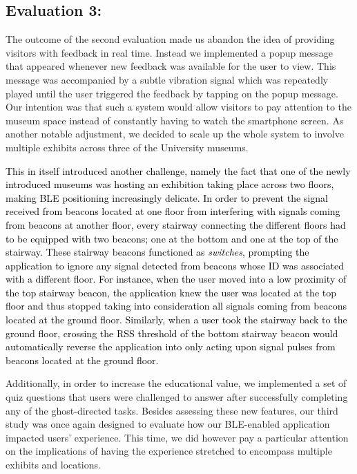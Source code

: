 \documentclass[prodmode,acmtomm]{acmsmall}
\begin{document}
\subsection{Evaluation 3: }
The outcome of the second evaluation made us abandon the idea of providing visitors with feedback in real time. Instead we implemented a popup message that appeared whenever new feedback was available for the user to view. This message was accompanied by a subtle vibration signal which was repeatedly played until the user triggered the feedback by tapping on the popup message. Our intention was that such a system would allow visitors to pay attention to the museum space instead of constantly having to watch the smartphone screen.
As another notable adjustment, we decided to scale up the whole system to involve multiple exhibits across three of the University museums. 

\textcolor{black}{This in itself introduced another challenge, namely the fact that one of the newly introduced museums was hosting an exhibition taking place across two floors, making BLE positioning increasingly delicate. In order to prevent the signal received from beacons located at one floor from interfering with signals coming from beacons at another floor, every stairway connecting the different floors had to be equipped with two beacons; one at the bottom and one at the top of the stairway. These stairway beacons functioned as \textit{switches}, prompting the application to ignore any signal detected from beacons whose ID was associated with a different floor. For instance, when the user moved into a low proximity of the top stairway beacon, the application knew the user was located at the top floor and thus stopped taking into consideration all signals coming from beacons located at the ground floor. Similarly, when a user took the stairway back to the ground floor, crossing the RSS threshold of the bottom stairway beacon would automatically reverse the application into only acting upon signal pulses from beacons located at the ground floor.}

Additionally, in order to increase the educational value, we implemented a set of quiz questions that users were challenged to answer after successfully completing any of the ghost-directed tasks. 
Besides assessing these new features, our third study was once again designed to evaluate how our BLE-enabled application impacted users’ experience. This time, we did however pay a particular attention on the implications of having the experience stretched to encompass multiple exhibits and locations.  
\end{document}
